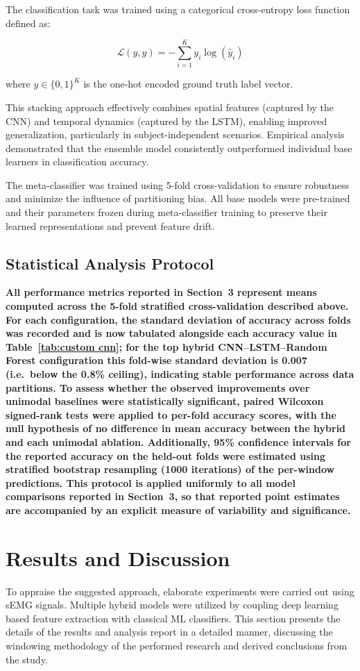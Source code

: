 \documentclass{elektr}
\newcommand{\yh}[1]{{\color{revhi}\textbf{#1}}}
\begin{document}
The classification task was trained using a categorical cross-entropy loss function defined as:

\begin{equation}
	\mathcal{L}(y, \hat{y}) = -\sum_{i=1}^{K} y_i \log(\hat{y}_i)
\end{equation}

where $y \in \{0, 1\}^K$ is the one-hot encoded ground truth label vector.

This stacking approach effectively combines spatial features (captured by the CNN) and temporal dynamics (captured by the LSTM), enabling improved generalization, particularly in subject-independent scenarios. Empirical analysis demonstrated that the ensemble model consistently outperformed individual base learners in classification accuracy.

The meta-classifier was trained using 5-fold cross-validation to ensure robustness and minimize the influence of partitioning bias. All base models were pre-trained and their parameters frozen during meta-classifier training to preserve their learned representations and prevent feature drift.

\subsection{Statistical Analysis Protocol}
\yh{All performance metrics reported in Section~3 represent means computed across the 5-fold stratified cross-validation described above. For each configuration, the standard deviation of accuracy across folds was recorded and is now tabulated alongside each accuracy value in Table~\mbox{\ref{tab:custom cnn}}; for the top hybrid CNN--LSTM--Random Forest configuration this fold-wise standard deviation is 0.007 (i.e.\ below the 0.8\% ceiling), indicating stable performance across data partitions. To assess whether the observed improvements over unimodal baselines were statistically significant, paired Wilcoxon signed-rank tests were applied to per-fold accuracy scores, with the null hypothesis of no difference in mean accuracy between the hybrid and each unimodal ablation. Additionally, 95\% confidence intervals for the reported accuracy on the held-out folds were estimated using stratified bootstrap resampling (1000 iterations) of the per-window predictions. This protocol is applied uniformly to all model comparisons reported in Section~3, so that reported point estimates are accompanied by an explicit measure of variability and significance.}
\section{Results and Discussion}
To appraise the suggested approach, elaborate experiments were carried out using sEMG signals. Multiple hybrid models were utilized by coupling deep learning based feature extraction with classical ML classifiers. This section presents the details of the results and analysis report in a detailed manner, discussing the windowing methodology of the performed research and derived conclusions from the study.
\end{document}
